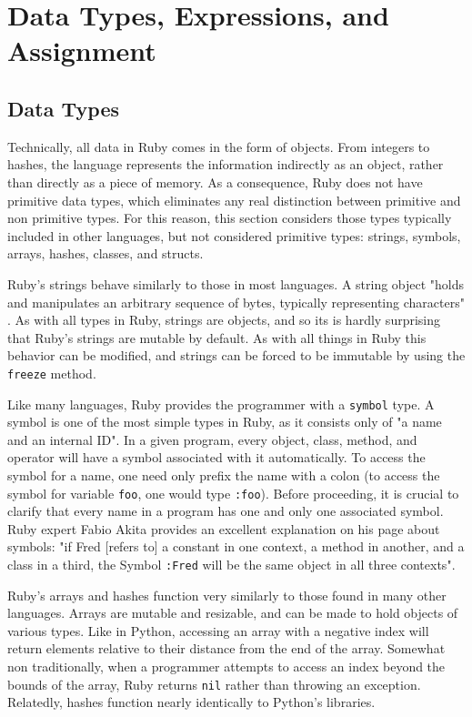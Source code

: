\documentclass[12pt]{article}
\begin{document}
\pagebreak
\section{Data Types, Expressions, and Assignment}

\subsection{Data Types}
Technically, all data in Ruby comes in the form of objects. From integers to hashes, the language represents the information indirectly as an object, rather than directly as a piece of memory. As a consequence, Ruby does not have primitive data types, which eliminates any real distinction between primitive and non primitive types. For this reason, this section considers those types typically included in other languages, but not considered primitive types: strings, symbols, arrays, hashes, classes, and structs.

Ruby's strings behave similarly to those in most languages. A string object "holds and manipulates an arbitrary sequence of bytes, typically representing characters" \cite{docs_string}. As with all types in Ruby, strings are objects, and so its is hardly surprising that Ruby's strings are mutable by default. As with all things in Ruby this behavior can be modified, and strings can be forced to be immutable by using the \verb|freeze| method.

Like many languages, Ruby provides the programmer with a \verb|symbol| type. A symbol is one of the most simple types in Ruby, as it consists only of "a name and an internal ID"\cite{learning_symbols}. In a given program, every object, class, method, and operator will have a symbol associated with it automatically. To access the symbol for a name, one need only prefix the name with a colon (to access the symbol for variable \verb|foo|, one would type \verb|:foo|). Before proceeding, it is crucial to clarify that every name in a program has one and only one associated symbol. Ruby expert Fabio Akita provides an excellent explanation on his page about symbols: "if Fred [refers to] a constant in one context, a method in another, and a class in a third, the Symbol \verb|:Fred| will be the same object in all three contexts"\cite{learning_symbols}.

Ruby's arrays and hashes function very similarly to those found in many other languages. Arrays are mutable and resizable, and can be made to hold objects of various types\cite{learning_arrays}. Like in Python, accessing an array with a negative index will return elements relative to their distance from the end of the array. Somewhat non traditionally, when a programmer attempts to access an index beyond the bounds of the array, Ruby returns \verb|nil| rather than throwing an exception. Relatedly, hashes function nearly identically to Python's libraries\cite{docs_hashes}.
\end{document}
